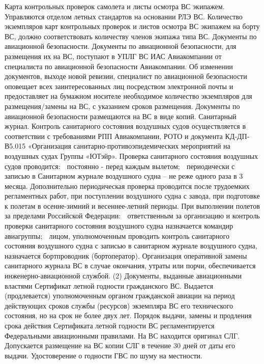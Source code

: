 Карта контрольных проверок самолета и листы осмотра ВС экипажем.
Управляются отделом летных стандартов на основании РЛЭ ВС.
Количество экземпляров карт контрольных проверок и листов осмотра ВС экипажем на борту ВС, должно соответствовать количеству членов экипажа типа ВС.
Документы по авиационной безопасности.
Документы по авиационной безопасности, для размещения их на ВС, поступают в УПЛГ ВС ИАС Авиакомпании от специалиста по авиационной безопасности Авиакомпании. Об изменении документов, выходе новой ревизии, специалист по авиационной безопасности оповещает всех заинтересованных лиц посредством электронной почты и предоставляет на бумажном носителе необходимое количество экземпляров для размещения/замены на ВС, с указанием сроков размещения. Документы по авиационной безопасности размещаются на ВС в виде копий.
Санитарный журнал.
Контроль санитарного состояния воздушных судов осуществляется в соответствии с требованиями РПП Авиакомпании, РОТО и документа КД-ДП-В5.015 «Организация санитарно-противоэпидемических мероприятий на воздушных судах Группы «ЮТэйр».
 Проверка санитарного состояния воздушных судов проводится:
	постоянно - перед каждым вылетом;
	периодически с записью в Санитарном журнале воздушного судна – не реже одного раза в 3 месяца.       
Дополнительно периодическая проверка проводится после трудоемких регламентных работ, при поступлении воздушного судна с завода, при подготовке к полетам в осенне-зимний и весеннее-летний периоды.
При выполнении полетов за пределами Российской Федерации:
	ответственным за организацию и контроль проверки санитарного состояния воздушного судна назначается командир авиагруппы;
	лицом, уполномоченным проводить контроль санитарного состояния воздушного судна с записью в санитарном журнале воздушного судна, назначается бортпроводник (бортоператор). 
Организация оперативной замены санитарного журнала ВС в случае окончания, утраты или порчи, обеспечивается инженерно-авиационной службой.
           (2)  Документы, выданные авиационными властями Сертификат летной годности 
                                                                гражданского ВС.
Выдается (продлевается) уполномоченным органом гражданской авиации на период действующих сроков службы (ресурсов) экземпляра ВС его технического состояния, но на срок не более двух лет.
Порядок выдачи, замены и продления срока действия Сертификата летной годности ВС регламентируется Федеральными авиационными правилами. 
 На ВС находится оригинал СЛГ. Допускается размещение на ВС копии СЛГ в течение 30 дней от даты его выдачи.
Удостоверение о годности ГВС по шуму на местности.
